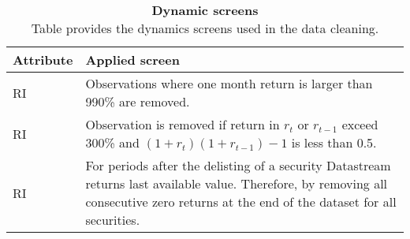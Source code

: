 \documentclass{article}
\begin{document}
\begin{table}[ht] 
\small
\caption[Dynamic screens]{\textbf{Dynamic screens}\\ Table provides the dynamics screens used in the data cleaning.}
 \label{table:DynamicScreens}
\centering
\begin{tabularx}{\textwidth}{l X}
\toprule
Attribute & Applied screen \\
\midrule
RI 		& Observations where one month return is larger than 990\% are removed.\\
RI		& Observation is removed if return in $r_t$ or $r_{t-1}$ exceed 300\% and $(1+r_{t})(1+r_{t-1}) -1$ is less than 0.5. \\
RI 		& For periods after the delisting of a security Datastream returns last available value. Therefore, by removing all consecutive zero returns at the end of the dataset for all securities.\\
 \bottomrule
 \end{tabularx}
 \end{table} 
\end{document}
